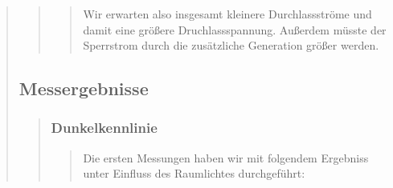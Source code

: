 \begin{quote}
\begin{quote}
\begin{quote}
            Wir erwarten also insgesamt kleinere Durchlassströme und damit eine größere Druchlassspannung. Außerdem
            müsste der Sperrstrom durch die zusätzliche Generation größer werden.

        \end{quote} %





    \end{quote} %


    \subsection{Messergebnisse}
    \begin{quote}

        \subsubsection{Dunkelkennlinie}
        \begin{quote}

            Die ersten Messungen haben wir mit folgendem Ergebniss unter Einfluss des Raumlichtes durchgeführt:


\end{quote}
\end{quote}
\end{quote}
